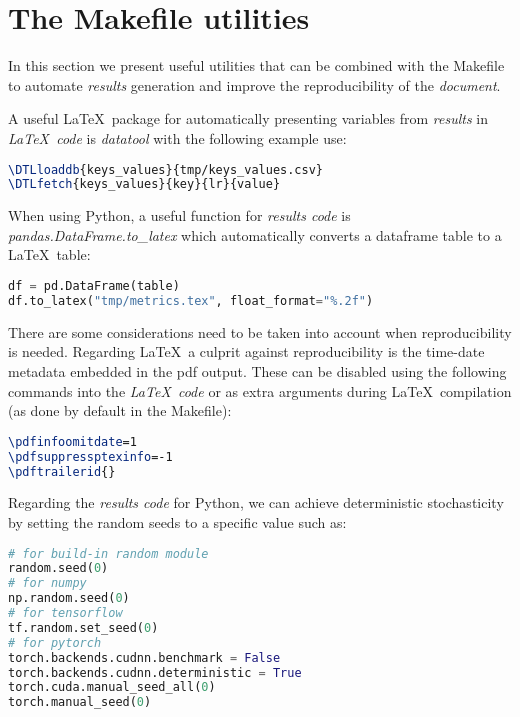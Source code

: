 \documentclass[journal]{IEEEtran}
\begin{document}
\section{The Makefile utilities}
In this section we present useful utilities that can be combined with the Makefile to automate \textit{results} generation and improve the reproducibility of the \textit{document}.

A useful \LaTeX\ package for automatically presenting variables from \textit{results} in \textit{\LaTeX\ code} is \textit{datatool} with the following example use:
\begin{lstlisting}[language=TeX, style=lststyle, caption={\LaTeX\ datatool example of loading a file that contains pairs of keys and values (tmp/keys\_values.csv) generated by a \textit{results code} and getting the value of a key named lr.}]
\DTLloaddb{keys_values}{tmp/keys_values.csv}
\DTLfetch{keys_values}{key}{lr}{value}
\end{lstlisting}

When using Python, a useful function for \textit{results code} is \textit{pandas.DataFrame.to\_latex} which automatically converts a dataframe table to a \LaTeX\ table:
\begin{lstlisting}[language=python, style=lststyle, caption={Convert Pandas DataFrame (df) to \LaTeX\ table (tmp/metrics.tex) in \textit{results code}.}]
df = pd.DataFrame(table)
df.to_latex("tmp/metrics.tex", float_format="%.2f")
\end{lstlisting}

There are some considerations need to be taken into account when reproducibility is needed.
Regarding \LaTeX\, a culprit against reproducibility is the time-date metadata embedded in the pdf output.
These can be disabled using the following commands into the \textit{\LaTeX\ code} or as extra arguments during \LaTeX\ compilation (as done by default in the Makefile):
\begin{lstlisting}[language=TeX, style=lststyle, caption={\LaTeX\ pdf reproducibility commands.}]
\pdfinfoomitdate=1
\pdfsuppressptexinfo=-1
\pdftrailerid{}
\end{lstlisting}

Regarding the \textit{results code} for Python, we can achieve deterministic stochasticity by setting the random seeds to a specific value such as:
\begin{lstlisting}[language=python, style=lststyle, caption={Python reproducibility commands for popular libraries.}]
# for build-in random module
random.seed(0)
# for numpy
np.random.seed(0)
# for tensorflow
tf.random.set_seed(0)
# for pytorch
torch.backends.cudnn.benchmark = False
torch.backends.cudnn.deterministic = True
torch.cuda.manual_seed_all(0)
torch.manual_seed(0)
\end{lstlisting}
\end{document}
